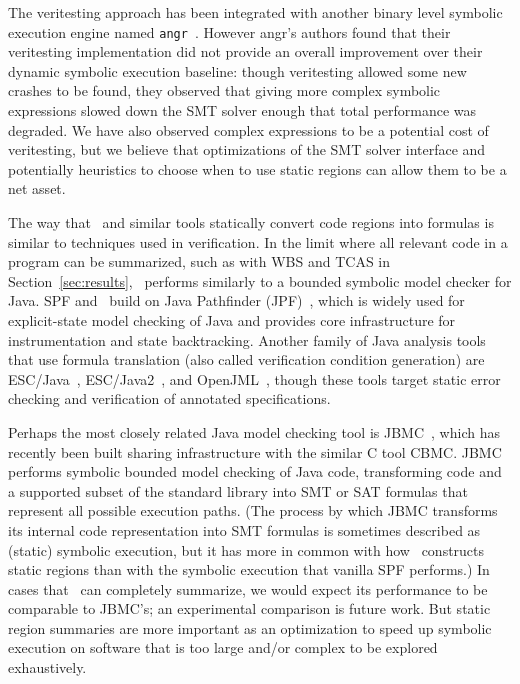 The veritesting approach has been integrated with another binary level
symbolic execution engine named {\tt angr}~\cite{angr}.
%
However angr's authors found that their veritesting implementation did
not provide an overall improvement over their dynamic symbolic
execution baseline: though veritesting allowed some new crashes to be
found, they observed that giving more complex symbolic expressions
slowed down the SMT solver enough that total performance was degraded.
%
We have also observed complex expressions to be a potential cost of
veritesting, but we believe that optimizations of the SMT solver
interface and potentially heuristics to choose when to use static
regions can allow them to be a net asset.

The way that \tool\ and similar tools statically convert code
regions into formulas is similar to techniques used in verification.
%
In the limit where all relevant code in a program can be
summarized, such as with WBS and TCAS in Section~\ref{sec:results},
\tool\ performs similarly to a bounded symbolic model checker for
Java.
%
SPF and \tool\ build on Java Pathfinder (JPF)~\cite{jpf}, which is
widely used for explicit-state model checking of Java and provides
core infrastructure for instrumentation and state backtracking.
%
Another family of Java analysis tools that use formula translation
(also called verification condition generation) are
ESC/Java~\cite{FlanaganLLNSS2002}, ESC/Java2~\cite{CokK2004}, and
OpenJML~\cite{Cok2011}, though these tools target static error
checking and verification of annotated specifications.

Perhaps the most closely related Java model checking tool is
JBMC~\cite{CordeiroKKST2018}, which has recently been built sharing
infrastructure with the similar C tool CBMC.
%
JBMC performs symbolic bounded model checking of Java code,
transforming code and a supported subset of the standard library into
SMT or SAT formulas that represent all possible execution paths.
%
(The process by which JBMC transforms its internal code representation
into SMT formulas is sometimes described as (static) symbolic
execution, but it has more in common with how \tool\ constructs static
regions than with the symbolic execution that vanilla SPF performs.)
%
In cases that \tool\ can completely summarize, we would expect its
performance to be comparable to JBMC's; an experimental comparison is
future work.
%
But static region summaries are more important as an optimization to
speed up symbolic execution on software that is too large and/or
complex to be explored exhaustively.

